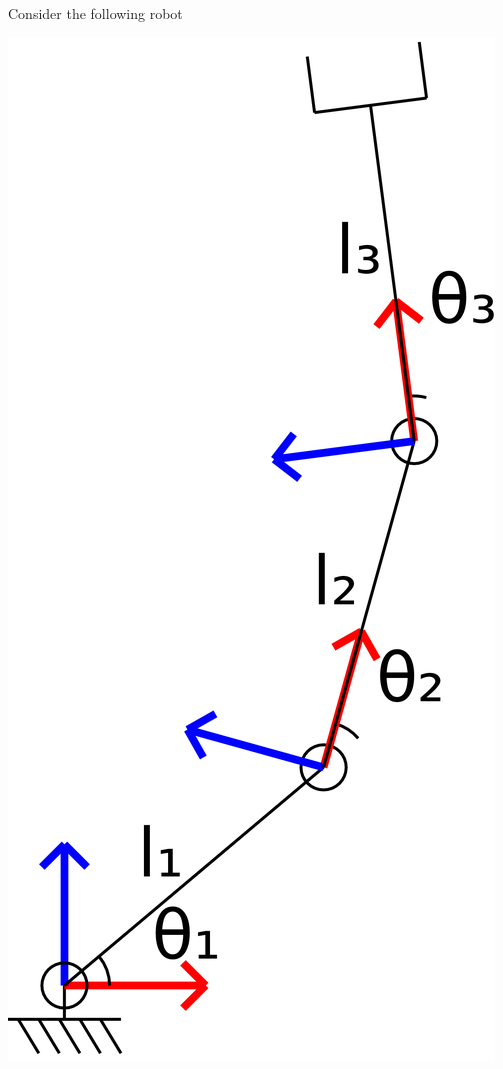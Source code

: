 \documentclass{16384_doc} %
\begin{document}
\begin{questions}
    Consider the following robot
    \begin{center}
    \includegraphics[scale=0.07]{generated_figures/RRR_nonsingular.png}
    \end{center}

\end{questions}
\end{document}
